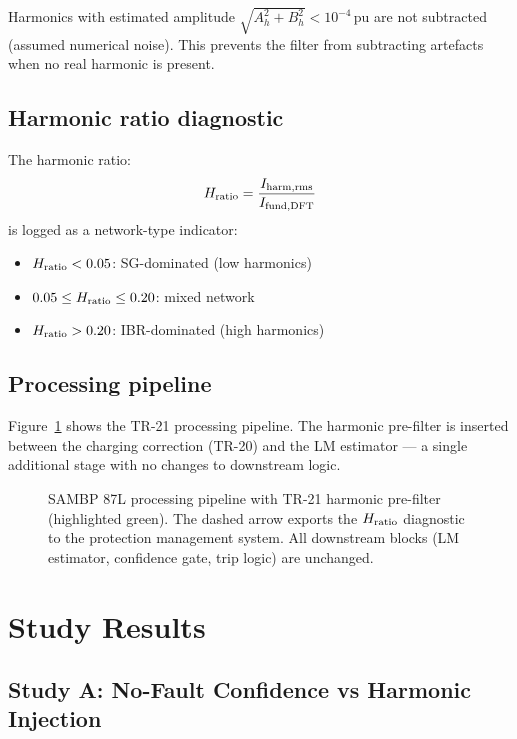 \documentclass[11pt, a4paper]{article}
\begin{document}
Harmonics with estimated amplitude $\sqrt{A_h^2 + B_h^2} < 10^{-4}$\,pu are
not subtracted (assumed numerical noise).  This prevents the filter from
subtracting artefacts when no real harmonic is present.

\subsection{Harmonic ratio diagnostic}

The harmonic ratio:
\begin{equation}
  H_{\rm ratio} = \frac{I_{\rm harm,rms}}{I_{\rm fund,DFT}}
\end{equation}
is logged as a network-type indicator:
\begin{itemize}
  \item $H_{\rm ratio} < 0.05$: SG-dominated (low harmonics)
  \item $0.05 \leq H_{\rm ratio} \leq 0.20$: mixed network
  \item $H_{\rm ratio} > 0.20$: IBR-dominated (high harmonics)
\end{itemize}

\subsection{Processing pipeline}

Figure~\ref{fig:pipeline} shows the TR-21 processing pipeline.  The harmonic
pre-filter is inserted between the charging correction (TR-20) and the LM
estimator — a single additional stage with no changes to downstream logic.

\begin{figure}[h]
  \centering
  \resizebox{\textwidth}{!}{}
  \caption{SAMBP 87L processing pipeline with TR-21 harmonic pre-filter
           (highlighted green).  The dashed arrow exports the $H_{\rm ratio}$
           diagnostic to the protection management system.
           All downstream blocks (LM estimator, confidence gate, trip logic)
           are unchanged.}
  \label{fig:pipeline}
\end{figure}


\section{Study Results}
\label{sec:results}

\subsection{Study A: No-Fault Confidence vs Harmonic Injection}
\end{document}
